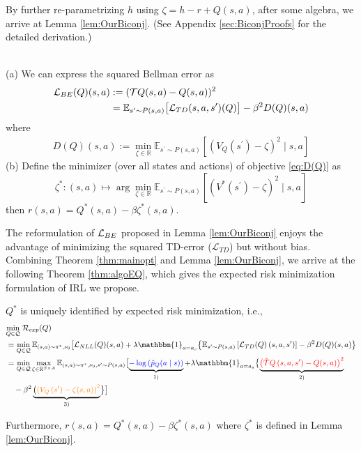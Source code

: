 \noindent By further re-parametrizing $h$ using $\zeta = h - r + Q(s,a)$, after some algebra, we arrive at Lemma \ref{lem:OurBiconj}. (See Appendix \ref{sec:BiconjProofs} for the detailed derivation.)

\begin{lem}
\label{lem:OurBiconj}
\;\\
(a) We can express the squared Bellman error as
\begin{align}
    \mathcal{L}_{BE}(Q)(s, a)&:=(\mathcal{T} Q(s, a)-Q(s, a))^2 \notag
    \\
    &=\mathbb{E}_{s^\prime \sim P(s, a)} 
    \bigl[\mathcal{L}_{TD}(s, a, s^\prime)(Q)\bigr] - \beta^2 D(Q)(s, a) \label{eq:OurBiconj}
\end{align}
where
\begin{align}
    D(Q)(s, a):=\min _{\zeta \in \mathbb{R}} \mathbb{E}_{s^{\prime} \sim P(s, a)}\left[\left(V_{Q}\left(s^{\prime}\right)-\zeta\right)^2 \mid s, a\right]\label{eq:D(Q)}
\end{align}
(b) Define the minimizer (over all states and actions) of objective \eqref{eq:D(Q)} as
$$ \zeta^*: (s,a)\mapsto \arg\min_{\zeta\in \mathbb{R}}\mathbb{E}_{ s^\prime \sim P(s, a)}\left[\left(V^\ast(s^\prime)- \zeta\right)^2\mid s, a\right]$$
then
$r(s,a) = Q^*(s,a)-\beta \zeta^*(s,a)$.
\end{lem}
\noindent The reformulation of $\mathcal{L}_{BE}$ proposed in Lemma \ref{lem:OurBiconj} enjoys the advantage of minimizing the squared TD-error ($\mathcal{L}_{TD}$) but without bias. Combining Theorem \ref{thm:mainopt} and Lemma \ref{lem:OurBiconj}, we arrive at the following Theorem \ref{thm:algoEQ}, which gives the expected risk minimization formulation of IRL we propose.

\begin{thm}
\label{thm:algoEQ} $Q^*$ is uniquely identified by expected risk minimization, i.e.,  
\begin{align}
     &\underset{Q\in \mathcal{Q}}{\min }  \;\mathcal{R}_{exp}(Q) \notag
     \\
     &=\min _{Q \in \mathcal{Q}} \mathbb{E}_{(s, a) \sim \pi^*, \nu_0}\bigl[{\mathcal{L}_{N L L}(Q)(s, a)} +\lambda \mathbbm{1}_{a=a_s} \bigl\{\mathbb{E}_{s^{\prime} \sim P(s, a)}\left[{\mathcal{L}_{T D}(Q)\left(s, a, s^{\prime}\right)}\right]-\beta^2 {D(Q)(s, a)}\bigr\} \notag
     \\
    &=\min _{Q \in \mathcal{Q}}\max_{\zeta\in \mathbb{R}^{S\times A}} \mathbb{E}_{(s, a) \sim \pi^*, \nu_0, s^{\prime} \sim P(s, a)}\bigl[\underbrace{\textcolor{blue}{-\log \left(\hat{p}_Q(a \mid s)\right)}}_{1)} + \lambda\mathbbm{1}_{a=a_s}\bigl\{\underbrace{\textcolor{red}{\bigl(\hat{\mathcal{T}} Q\left(s, a, s^{\prime}\right)-Q(s, a)\bigr)^2}}_{{2)}} \notag
    \\
    & \quad -\beta^2 \underbrace{ \bigl(\textcolor{orange}{\left(V_{Q}\left(s^{\prime}\right)-\zeta(s,a)\right)^2} }_{{3)}}\bigr\} \bigr]\label{eq:AlgoOpt}
\end{align}

Furthermore, $r(s, a)=Q^*(s, a) - \beta \zeta^*(s, a)$ where $\zeta^*$ is defined in Lemma \ref{lem:OurBiconj}.
\end{thm}

